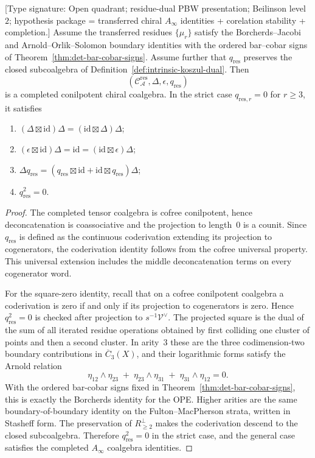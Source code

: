 \begin{theorem}
\label{thm:coalgebra-axioms-verified}
\textup{[Type signature: Open quadrant; residue-dual PBW
presentation; Beilinson level~$2$; hypothesis package = transferred
chiral $A_\infty$ identities + corelation stability + completion.]}
Assume the transferred residues $\{\mu_r\}$ satisfy the
Borcherds--Jacobi and Arnold--Orlik--Solomon boundary identities with
the ordered bar--cobar signs of
Theorem~\ref{thm:det-bar-cobar-signs}.  Assume further that
$q_{\mathrm{res}}$ preserves the closed subcoalgebra of
Definition~\ref{def:intrinsic-koszul-dual}. Then
\[
(\mathcal C_{\mathcal A}^{\mathrm{res}},
 \Delta,\epsilon,q_{\mathrm{res}})
\]
is a completed conilpotent chiral coalgebra. In the strict case
$q_{\mathrm{res},r}=0$ for $r\geq3$, it satisfies
\begin{enumerate}
\item $(\Delta\boxtimes \mathrm{id})\Delta
 =(\mathrm{id}\boxtimes\Delta)\Delta$;
\item $(\epsilon\boxtimes\mathrm{id})\Delta
 =\mathrm{id}=(\mathrm{id}\boxtimes\epsilon)\Delta$;
\item $\Delta q_{\mathrm{res}}
=(q_{\mathrm{res}}\boxtimes\mathrm{id}
+\mathrm{id}\boxtimes q_{\mathrm{res}})\Delta$;
\item $q_{\mathrm{res}}^2=0$.
\end{enumerate}
\end{theorem}

\begin{proof}
The completed tensor coalgebra is cofree conilpotent, hence
deconcatenation is coassociative and the projection to length~$0$ is a
counit. Since $q_{\mathrm{res}}$ is defined as the continuous coderivation extending
its projection to cogenerators, the coderivation identity follows from
the cofree universal property.  This universal extension includes the
middle deconcatenation terms on every cogenerator word.

For the square-zero identity, recall that on a cofree conilpotent
coalgebra a coderivation is zero if and only if its projection to
cogenerators is zero. Hence $q_{\mathrm{res}}^2=0$ is checked after projection to
$s^{-1}\mathcal{V}^{\vee}$. The projected square is the dual of the
sum of all iterated residue operations obtained by first colliding one
cluster of points and then a second cluster. In arity~$3$ these are the
three codimension-two boundary contributions in
$\overline{C}_3(X)$, and their logarithmic forms satisfy the Arnold
relation
\[
\eta_{12}\wedge\eta_{23}
\;+\;\eta_{23}\wedge\eta_{31}
\;+\;\eta_{31}\wedge\eta_{12}=0.
\]
With the ordered bar-cobar signs fixed in
Theorem~\ref{thm:det-bar-cobar-signs},
this is exactly the Borcherds identity for the OPE. Higher arities are
the same boundary-of-boundary identity on the Fulton--MacPherson
strata, written in Stasheff form. The preservation of
$R_{\geq2}^{\perp}$ makes the coderivation descend to the closed
subcoalgebra. Therefore $q_{\mathrm{res}}^2=0$ in the strict case, and the general
case satisfies the completed $A_\infty$ coalgebra identities.
\end{proof}

